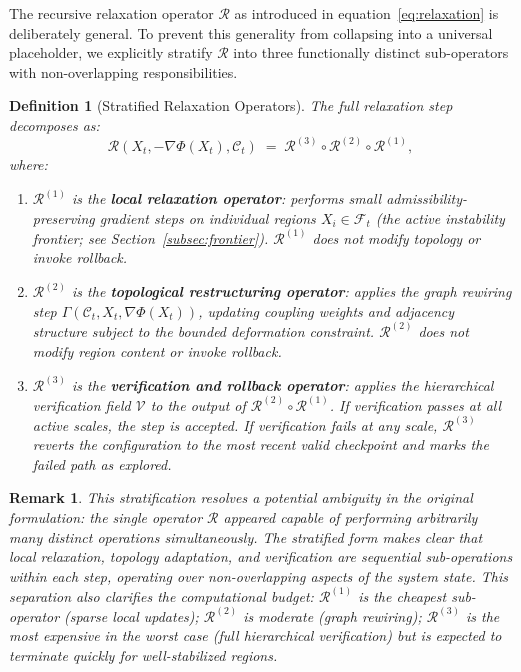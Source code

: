 \documentclass[11pt, a4paper]{article}
\theoremstyle{srn}
\newtheorem{definition}{Definition}[section]
\theoremstyle{srnremark}
\newtheorem{remark}{Remark}[section]
\newcommand{\Cstruct}{\mathcal{C}}           %
\newcommand{\Rop}{\mathcal{R}}           %
\newcommand{\Gop}{\Gamma}              %
\newcommand{\Phiten}{\varPhi}            %
\begin{document}
The recursive relaxation operator $\Rop$ as introduced in
equation~\eqref{eq:relaxation} is deliberately general.
To prevent this generality from collapsing into a universal
placeholder, we explicitly stratify $\Rop$ into three functionally
distinct sub-operators with non-overlapping responsibilities.

\begin{definition}[Stratified Relaxation Operators]
\label{def:stratified}
The full relaxation step decomposes as:
\[
  \Rop(X_t, -\nabla\Phiten(X_t), \Cstruct_t)
  \;=\;
  \Rop^{(3)} \circ \Rop^{(2)} \circ \Rop^{(1)},
\]
where:
\begin{enumerate}
  \item[(i)] $\Rop^{(1)}$ is the \textbf{local relaxation operator}:
    performs small admissibility-preserving gradient steps on
    individual regions $X_i \in \mathcal{F}_t$ (the active instability
    frontier; see Section~\ref{subsec:frontier}).
    $\Rop^{(1)}$ does not modify topology or invoke rollback.

  \item[(ii)] $\Rop^{(2)}$ is the \textbf{topological restructuring
    operator}: applies the graph rewiring step $\Gop(\Cstruct_t, X_t,
    \nabla\Phiten(X_t))$, updating coupling weights and adjacency
    structure subject to the bounded deformation constraint.
    $\Rop^{(2)}$ does not modify region content or invoke rollback.

  \item[(iii)] $\Rop^{(3)}$ is the \textbf{verification and rollback
    operator}: applies the hierarchical verification field
    $\mathcal{V}$ to the output of $\Rop^{(2)} \circ \Rop^{(1)}$.
    If verification passes at all active scales, the step is accepted.
    If verification fails at any scale, $\Rop^{(3)}$ reverts the
    configuration to the most recent valid checkpoint and marks the
    failed path as explored.
\end{enumerate}
\end{definition}

\begin{remark}
This stratification resolves a potential ambiguity in the original
formulation: the single operator $\Rop$ appeared capable of performing
arbitrarily many distinct operations simultaneously.
The stratified form makes clear that local relaxation, topology
adaptation, and verification are sequential sub-operations within each
step, operating over non-overlapping aspects of the system state.
This separation also clarifies the computational budget: $\Rop^{(1)}$
is the cheapest sub-operator (sparse local updates); $\Rop^{(2)}$ is
moderate (graph rewiring); $\Rop^{(3)}$ is the most expensive in
the worst case (full hierarchical verification) but is expected to
terminate quickly for well-stabilized regions.
\end{remark}
\end{document}
